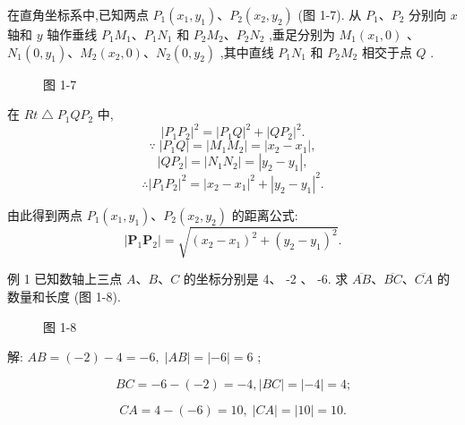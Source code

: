 \documentclass[lang=cn,newtx,12pt,scheme=chinese]{elegantbook}
\begin{document}
在直角坐标系中,已知两点 \({P}_{1}\left( {{x}_{1},{y}_{1}}\right) \text{、}{P}_{2}\left( {{x}_{2},{y}_{2}}\right)\) (图 1-7). 从 \({P}_{1}\text{、}{P}_{2}\) 分别向 \(x\) 轴和 \(y\) 轴作垂线 \({P}_{1}{M}_{1}\text{、}{P}_{1}{N}_{1}\) 和 \({P}_{2}{M}_{2}\text{、}{P}_{2}{N}_{2}\) ,垂足分别为 \({M}_{1}\left( {{x}_{1},0}\right)\) 、 \({N}_{1}\left( {0,{y}_{1}}\right) \text{、}{M}_{2}\left( {{x}_{2},0}\right) \text{、}{N}_{2}\left( {0,{y}_{2}}\right)\) ,其中直线 \({P}_{1}{N}_{1}\) 和 \({P}_{2}{M}_{2}\) 相交于点 \(Q\) .

\begin{figure}[h]
  \centering
  
  \caption{图 1-7}
\end{figure}

在 \({Rt}\bigtriangleup {P}_{1}Q{P}_{2}\) 中,
\[
{\left| {P}_{1}{P}_{2}\right| }^{2} = {\left| {P}_{1}Q\right| }^{2} + {\left| Q{P}_{2}\right| }^{2} .
\]
\[
\because \;\left| {{P}_{1}Q}\right| = \left| {{M}_{1}{M}_{2}}\right| = \left| {{x}_{2} - {x}_{1}}\right| , 
\]
\[
\left| {Q{P}_{2}}\right| = \left| {{N}_{1}{N}_{2}}\right| = \left| {{y}_{2} - {y}_{1}}\right| ,
\]
\[
  \therefore {\left| {P}_{1}{P}_{2}\right| }^{2} = {\left| {x}_{2} - {x}_{1}\right| }^{2} + {\left| {y}_{2} - {y}_{1}\right| }^{2}\text{.}
\]
\begin{corollary}[两点间距离公式]
由此得到两点 \({P}_{1}\left( {{x}_{1},{y}_{1}}\right) \text{、}{P}_{2}\left( {{x}_{2},{y}_{2}}\right)\) 的距离公式:
\[
  \left| {{\mathbf{P}}_{1}{\mathbf{P}}_{2}}\right| = \sqrt{{\left( {x}_{2} - {x}_{1}\right) }^{2} + {\left( {y}_{2} - {y}_{1}\right) }^{2}}.
\]
\end{corollary}
例 1 已知数轴上三点 \(A\text{、}B\text{、}C\) 的坐标分别是 4、 -2 、 -6. 求 \(\overline{AB}\text{、}\overline{BC}\text{、}\overline{CA}\) 的数量和长度 (图 1-8).

\begin{figure}[h]
  \centering
  
  \caption{图 1-8}
\end{figure}

解: \({AB} = \left( {-2}\right) - 4 = - 6,\;\left| {AB}\right| = \left| {-6}\right| = 6\) ;

\[
    {BC} = - 6 - \left( {-2}\right) = - 4,\left| {BC}\right| = \left| {-4}\right| = 4\text{;}
\]

\[
    {CA} = 4 - \left( {-6}\right) = {10},\;\left| {CA}\right| = \left| {10}\right| = {10}.
\]
\end{document}
